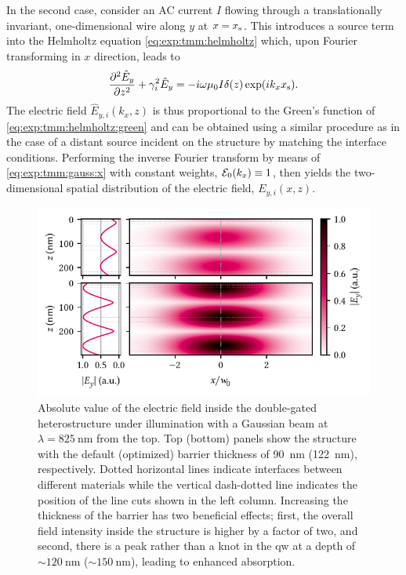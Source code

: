 In the second case, \citet{Langevin2024} consider an AC current $I$ flowing through a translationally invariant, one-dimensional wire along $y$ at $x=x_{\mathrm{s}}$.
This introduces a source term into the Helmholtz equation \cref{eq:exp:tmm:helmholtz} which, upon Fourier transforming in $x$ direction, leads to
\begin{equation}\label{eq:exp:tmm:helmholtz:green}
    \pdv[2]{\hat{E}_y}{z} + \gamma_i^2\hat{E}_y = -i\omega\mu_0 I\delta(z)\exp(i k_x x_{\mathrm{s}}).
\end{equation}
The electric field $\hat{E}_{y,i}(k_x, z)$ is thus proportional to the Green's function of \cref{eq:exp:tmm:helmholtz:green} and can be obtained using a similar procedure as in the case of a distant source incident on the structure by matching the interface conditions.
Performing the inverse Fourier transform by means of \cref{eq:exp:tmm:gauss:x} with constant weights, $\mathcal{E}_0(k_x)\equiv 1$, then yields the two-dimensional spatial distribution of the electric field, $E_{y,i}(x, z)$.

\begin{figure}
    \centering
    \includegraphics{img/pdf/experiment/tmm_field}
    \caption[]{
        Absolute value of the electric field inside the double-gated heterostructure under illumination with a Gaussian beam at $\lambda=\qty{825}{\nano\meter}$ from the top.
        Top (bottom) panels show the structure with the default (optimized) barrier thickness of \qty{90}{\nano\meter} (\qty{122}{\nano\meter}), respectively.
        Dotted horizontal lines indicate interfaces between different materials while the vertical dash-dotted line indicates the position of the line cuts shown in the left column.
        Increasing the thickness of the barrier has two beneficial effects; first, the overall field intensity inside the structure is higher by a factor of two, and second, there is a peak rather than a knot in the \gls{qw} at a depth of $\sim\qty{120}{\nano\meter}$ ($\sim\qty{150}{\nano\meter}$), leading to enhanced absorption.
    }
    \label{fig:exp:tmm:field}
\end{figure}


